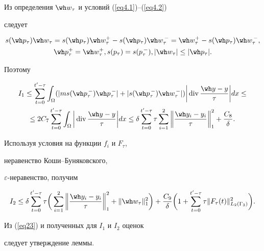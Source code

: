 \begin{pf}
Из определения $\wh w_{\tau}$ и условий (\ref{eq4.1})--(\ref{eq4.2})


следует


\begin{gather*}


s(\wh p_{\tau}) \wh w_{\tau} = s(\wh p_{\tau}) \wh w_{\tau}^{+}


- s(\wh p_{\tau}) \wh w_{\tau}^{\,-}= \wh w_{\tau}^{+}-


s(\wh p_{\tau}) \wh w_{\tau}^{\,-}, \\


%


\wh p_{\tau}^{+}=


\wh w_{\tau}^{+}, s(p_{\tau})=s(p_{\tau}^{\,-}), 


| \wh w_{\tau}| \leq |\wh p_{\tau}|.


\end{gather*}


Поэтому


\begin{multline*}


I_{1} \leq \sum_{t=0}^{t'-\tau} \int_{\Omega}


(|m s(\wh p_{\tau}^{\,-}) \wh p_{\tau}^{\,-}| + |s(\wh p_{\tau}^{\,-})


\wh w_{\tau}^{\,-}|)\bigg| \Div \frac{\wh y-y}{\tau} \bigg| dx\leq \\


%


\leq 2 C_{7} \sum_{t=0}^{t'-\tau} \int_{\Omega}


\bigg| \Div \frac{\wh y-y}{\tau} \bigg| dx


\leq \delta


 \sum _{t=0}^{t'- \tau} \tau \sum_{i=1}


^{2} \bigg\| \frac{\wh y_{i}-y_{i}}{\tau} \bigg\|^{2}_{1} 


+ \frac{C_8}{\delta}.


\end{multline*}


Используя условия на функции $f_{i}$ и $F_{\tau}$,


неравенство Коши--Буняковского,


$\varepsilon$-неравенство, получим


$$


I_{2} \leq \delta


 \sum _{t=0}^{t'- \tau} \tau \bigg(\sum_{i=1}


^{2} \bigg\| \frac{\wh y_{i}-y_{i}}{\tau} \bigg\|^{2}_{1} + \|


\wh w_{\tau} \|_{1}^{2} \bigg) +


\frac{C_9}{\delta} \bigg(1 + \sum_{t=0}^{t'- \tau}


\tau \| F_{\tau}(t) \|_{L_{2}(\Gamma_{3})}^{2} \bigg).


$$


Из (\ref{eq23}) и полученных для $I_{1}$ и $I_{2}$ оценок


следует утверждение леммы.


\end{pf}





